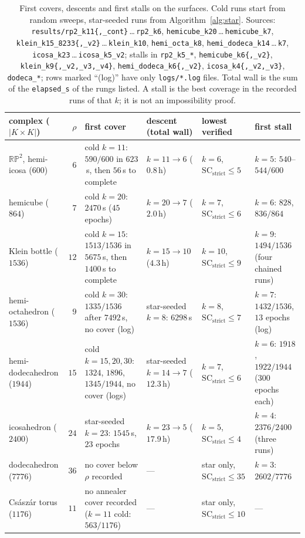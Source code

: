 \documentclass[12pt]{article}
\newcommand{\SC}{\mathrm{SC}}
\newcommand{\SCst}{\SC_{\mathrm{strict}}}
\begin{document}
\begin{table}[H]
\centering\footnotesize
\setlength{\tabcolsep}{3pt}
\begin{tabular}{@{}l r>{\raggedright\arraybackslash}p{2.9cm}>{\raggedright\arraybackslash}p{2.8cm}>{\raggedright\arraybackslash}p{1.8cm}>{\raggedright\arraybackslash}p{2.1cm}@{}}
\toprule
complex ($|K{\times}K|$) & $\rho$ & first cover & descent (total wall) &
lowest verified & first stall \\
\midrule
$\mathbb{RP}^2$, hemi-icosa ($600$)
 & $6$ & cold $k{=}11$: $590/600$ in $623$\,s, then $56$\,s to complete
 & $k{=}11\to6$ ($0.8$\,h) & $k{=}6$, $\SCst\le5$
 & $k{=}5$: $540$--$544/600$\\
hemicube ($864$)
 & $7$ & cold $k{=}20$: $2470$\,s ($45$ epochs)
 & $k{=}20\to7$ ($2.0$\,h) & $k{=}7$, $\SCst\le6$
 & $k{=}6$: $828$, $836/864$\\
Klein bottle ($1536$)
 & $12$ & cold $k{=}15$: $1513/1536$ in $5675$\,s, then $1400$\,s to complete
 & $k{=}15\to10$ ($4.3$\,h) & $k{=}10$, $\SCst\le9$
 & $k{=}9$: $1494/1536$ (four chained runs)\\
hemi-octahedron ($1536$)
 & $9$ & cold $k{=}30$: $1335/1536$ after $7492$\,s, no cover (log)
 & star-seeded $k{=}8$: $6298$\,s & $k{=}8$, $\SCst\le7$
 & $k{=}7$: $1432/1536$, $13$ epochs (log)\\
hemi-dodecahedron ($1944$)
 & $15$ & cold $k{=}15,20,30$: $1324$, $1896$, $1345/1944$, no cover (logs)
 & star-seeded $k{=}14\to7$ ($12.3$\,h) & $k{=}7$, $\SCst\le6$
 & $k{=}6$: $1918$, $1922/1944$ ($300$ epochs each)\\
icosahedron ($2400$)
 & $24$ & star-seeded $k{=}23$: $1545$\,s, $23$ epochs
 & $k{=}23\to5$ ($17.9$\,h) & $k{=}5$, $\SCst\le4$
 & $k{=}4$: $2376/2400$ (three runs)\\
dodecahedron ($7776$)
 & $36$ & no cover below $\rho$ recorded
 & --- & star only, $\SCst\le35$
 & $k{=}3$: $2602/7776$\\
Cs\'asz\'ar torus ($1176$)
 & $11$ & no annealer cover recorded ($k{=}11$ cold: $563/1176$)
 & --- & star only, $\SCst\le10$ & ---\\
\bottomrule
\end{tabular}
\caption{First covers, descents and first stalls on the surfaces.  Cold
runs start from random sweeps, star-seeded runs from
Algorithm~\ref{alg:star}.  Sources:
\texttt{results/rp2\_k11\{,\_cont\}}\,\dots\,\texttt{rp2\_k6},
\texttt{hemicube\_k20}\,\dots\,\texttt{hemicube\_k7},
\texttt{klein\_k15\_8233\{,\_v2\}}\,\dots\,\texttt{klein\_k10},
\texttt{hemi\_octa\_k8}, \texttt{hemi\_dodeca\_k14}\,\dots\,\texttt{k7},
\texttt{icosa\_k23}\,\dots\,\texttt{icosa\_k5\_v2}; stalls in
\texttt{rp2\_k5\_*}, \texttt{hemicube\_k6\{,\_v2\}},
\texttt{klein\_k9\{,\_v2,\_v3,\_v4\}}, \texttt{hemi\_dodeca\_k6\{,\_v2\}},
\texttt{icosa\_k4\{,\_v2,\_v3\}}, \texttt{dodeca\_*}; rows marked
``(log)'' have only \texttt{logs/*.log} files.  Total wall is the sum of the
\texttt{elapsed\_s} of the rungs listed.  A stall is the best coverage in the
recorded runs of that $k$; it is not an impossibility proof.}
\label{tab:descent}
\end{table}
\end{document}
